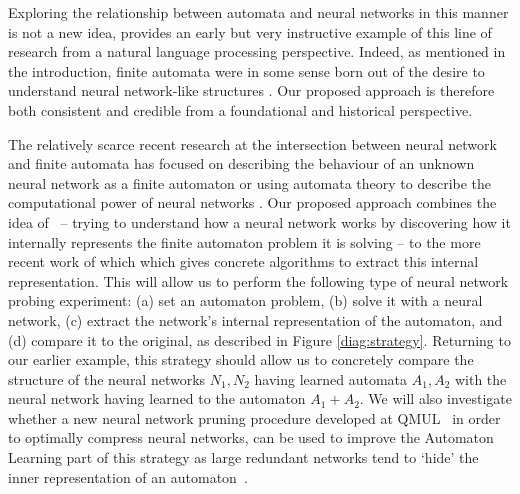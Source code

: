 \documentclass[11pt,a4paper]{article}
\begin{document}
		Exploring the relationship between automata and neural networks in this manner is not  a new idea, \cite{cleeremans1989finite} provides an early but very instructive example of this line of research from a natural language processing perspective. Indeed, as mentioned in the introduction, finite automata were in some sense born out of the desire to understand neural network-like structures \cite{kleene1951}. Our proposed approach is therefore both consistent and credible from a foundational and historical perspective. 
		
		The relatively scarce recent research at the intersection between neural network and finite automata has focused on describing the behaviour of an unknown neural network as a finite automaton \cite{weiss2018extracting,weiss2019learning} or using automata theory to describe the computational power of neural networks \cite{weiss2018practical}. Our proposed approach combines the idea of~\cite{cleeremans1989finite} -- trying to understand how a neural network works by discovering how it internally represents the finite automaton problem it is solving -- to the more recent work of \cite{weiss2018extracting,weiss2019learning} which which gives concrete algorithms to extract this internal representation. This will allow us to perform the following type of neural network probing experiment: (a) set an automaton problem, (b) solve it with a neural network, (c) extract the network's internal representation of the automaton, and (d) compare it to the original, as described in Figure \ref{diag:strategy}.  Returning to our earlier example, this strategy should allow us to concretely compare the structure of the neural networks $N_1, N_2$ having learned automata $A_1,A_2$ with the neural network having learned to the automaton $A_1+ A_2$.
		We will also investigate whether a new neural network pruning procedure developed at QMUL~\cite{pruning} in order to optimally compress neural networks, can be used to improve the Automaton Learning part of this strategy as large redundant  networks tend to `hide' the inner representation of an automaton~\cite{cleeremans1989finite}.
		
		
	
\end{document}
